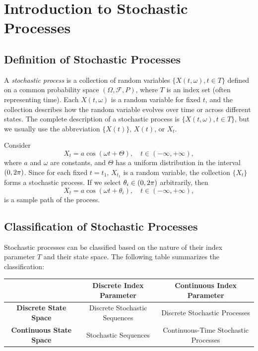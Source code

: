 \chapter{Introduction to Stochastic Processes}

\section{Definition of Stochastic Processes}

\begin{definition}
  A \emph{stochastic process} is a collection of random variables \(\{X(t, \omega), t \in T\}\) defined on a common probability space \((\Omega, \mathcal{F}, P)\), where \(T\) is an index set (often representing time). Each \(X(t, \omega)\) is a random variable for fixed \(t\), and the collection describes how the random variable evolves over time or across different states.
  The complete description of a stochastic process is \(\{X(t, \omega), t \in T\}\), but we usually use the abbreviation \(\{X(t)\}\), \(X(t)\), or \(X_t\).
\end{definition}

\begin{example}
  Consider
  \[
    X_t = a \cos(\omega t + \Theta), \quad t \in (-\infty, +\infty),
  \]
  where \(a\) and \(\omega\) are constants, and \(\Theta\) has a uniform distribution in the interval \((0, 2\mathrm{\pi})\). Since for each fixed \(t = t_1\), \(X_{t_1}\) is a random variable, the collection \(\{X_t\}\) forms a stochastic process. If we select \(\theta_i \in (0, 2\mathrm{\pi})\) arbitrarily, then
  \[
    X_t = a \cos(\omega t + \theta_i), \quad t \in (-\infty, +\infty),
  \]
  is a sample path of the process.
\end{example}

\section{Classification of Stochastic Processes}

Stochastic processes can be classified based on the nature of their index parameter \(T\) and their state space. The following table summarizes the classification:
\begin{center}
  \scriptsize
  \begin{tabular}{c c c}
    \toprule
    & \textbf{Discrete Index Parameter} & \textbf{Continuous Index Parameter} \\
    \midrule
    \textbf{Discrete State Space} & Discrete Stochastic Sequences & Discrete Stochastic Processes \\
    \textbf{Continuous State Space} & Stochastic Sequences & Continuous-Time Stochastic Processes \\
    \bottomrule
  \end{tabular}
\end{center}

